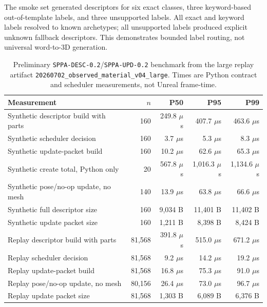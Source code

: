 ﻿\documentclass[11pt,a4paper]{article}
\begin{document}
The smoke set generated descriptors for six exact classes, three keyword-based
out-of-template labels, and three unsupported labels. All exact and keyword labels resolved
to known archetypes; all unsupported labels produced explicit unknown fallback
descriptors. This demonstrates bounded label routing, not universal
word-to-3D generation.

\begin{table}[h]
\centering
\small
\setlength{\tabcolsep}{3pt}
\caption{Preliminary \texttt{SPPA-DESC-0.2}/\texttt{SPPA-UPD-0.2} benchmark
from the large replay artifact \texttt{20260702\_observed\_material\_v04\_large}.
Times are Python contract and scheduler measurements, not Unreal frame-time.}
\label{tab:sppa-descriptor-update}
\begin{tabular}{@{}p{4.2cm}r r r r@{}}
\toprule
Measurement & \(n\) & P50 & P95 & P99 \\
\midrule
Synthetic descriptor build with parts & 160 & 249.8 \(\mu\)s & 407.7 \(\mu\)s & 463.6 \(\mu\)s \\
Synthetic scheduler decision & 160 & 3.7 \(\mu\)s & 5.3 \(\mu\)s & 8.3 \(\mu\)s \\
Synthetic update-packet build & 160 & 10.2 \(\mu\)s & 62.6 \(\mu\)s & 65.3 \(\mu\)s \\
Synthetic create total, Python only & 20 & 567.8 \(\mu\)s & 1,016.3 \(\mu\)s & 1,134.6 \(\mu\)s \\
Synthetic pose/no-op update, no mesh & 140 & 13.9 \(\mu\)s & 63.8 \(\mu\)s & 66.6 \(\mu\)s \\
Synthetic full descriptor size & 160 & 9,034 B & 11,401 B & 11,402 B \\
Synthetic update packet size & 160 & 1,211 B & 8,398 B & 8,424 B \\
Replay descriptor build with parts & 81,568 & 391.8 \(\mu\)s & 515.0 \(\mu\)s & 671.2 \(\mu\)s \\
Replay scheduler decision & 81,568 & 9.2 \(\mu\)s & 14.2 \(\mu\)s & 19.2 \(\mu\)s \\
Replay update-packet build & 81,568 & 16.8 \(\mu\)s & 75.3 \(\mu\)s & 91.0 \(\mu\)s \\
Replay pose/no-op update, no mesh & 80,156 & 26.4 \(\mu\)s & 73.0 \(\mu\)s & 96.7 \(\mu\)s \\
Replay update packet size & 81,568 & 1,303 B & 6,089 B & 6,376 B \\
\bottomrule
\end{tabular}
\end{table}
\end{document}
